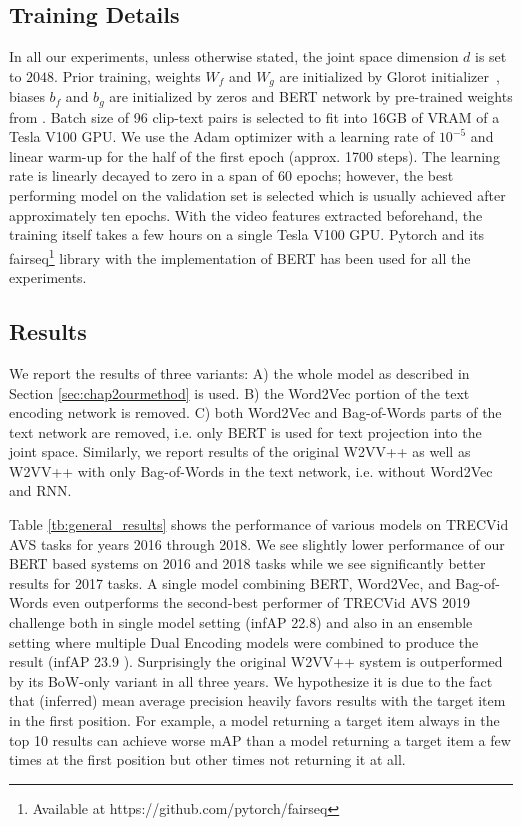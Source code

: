 \subsection{Training Details}\label{sec:trainingDetails}
In all our experiments, unless otherwise stated, the joint space dimension $d$ is set to $2048$.
Prior training, weights $W_f$ and $W_g$ are initialized by Glorot initiali\-zer~\cite{Xavier_Glorot_init}, biases $b_f$ and $b_g$ are initialized by zeros and BERT network by pre-trained weights from \cite{RoBERTa}. Batch size of 96 clip-text pairs is selected to fit into 16GB of VRAM of a Tesla V100 GPU. We use the Adam optimizer \cite{Adam14} with a learning rate of $10^{-5}$ and linear warm-up for the half of the first epoch (approx. 1700 steps). The learning rate is linearly decayed to zero in a span of 60 epochs; however, the best performing model on the validation set is selected which is usually achieved after approximately ten epochs. With the video features extracted beforehand, the training itself takes a few hours on a single Tesla V100 GPU. Pytorch and its fairseq\footnote{Available at https://github.com/pytorch/fairseq} library with the implementation of BERT has been used for all the experiments.

\subsection{Results}\label{sec:chap2results}
We report the results of three variants: A) the whole model as described in Section \ref{sec:chap2ourmethod} is used. B) the Word2Vec portion of the text encoding network is removed. C) both Word2Vec and Bag-of-Words parts of the text network are removed, i.e. only BERT is used for text projection into the joint space. Similarly, we report results of the original W2VV++ \cite{XirongW2VVpp} as well as W2VV++ with only Bag-of-Words in the text network, i.e. without Word2Vec and RNN.

Table \ref{tb:general_results} shows the performance of various models on TRECVid AVS tasks for years 2016 through 2018. We see slightly lower performance of our BERT based systems on 2016 and 2018 tasks while we see significantly better results for 2017 tasks. A single model combining BERT, Word2Vec, and Bag-of-Words even outperforms the second-best performer of TRECVid AVS 2019 challenge both in single model setting (infAP 22.8) and also in an ensemble setting where multiple Dual Encoding models were combined to produce the result (infAP 23.9 \cite{li2019renmin}). Surprisingly the original W2VV++ system is outperformed by its BoW-only variant in all three years. We hypothesize it is due to the fact that (inferred) mean average precision heavily favors results with the target item in the first position. For example, a model returning a target item always in the top 10 results can achieve worse mAP than a model returning a target item a few times at the first position but other times not returning it at all.


